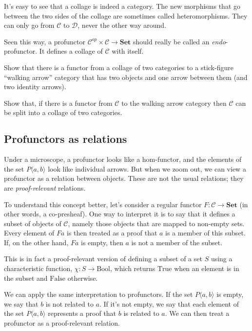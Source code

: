 \documentclass[DaoFP]{subfiles}
\begin{document}
It's easy to see that a collage is indeed a category. The new morphisms that go between the two sides of the collage are sometimes called heteromorphisms. They can only go from $\mathcal{C}$ to $\mathcal{D}$, never the other way around. 

Seen this way, a profunctor $ \mathcal{C}^{op} \times  \mathcal{C} \to \mathbf{Set}$ should really be called an \emph{endo}-profunctor. It defines a collage of $\mathcal{C}$ with itself.

\begin{exercise}
Show that there is a functor from a collage of two categories to a stick-figure ``walking arrow'' category that has two objects and one arrow between them (and two identity arrows).
\end{exercise}
\begin{exercise}
Show that, if there is a functor from $\mathcal{C}$ to the walking arrow category then $\mathcal{C}$ can be split into a collage of two categories. 
\end{exercise}

\subsection{Profunctors as relations}

Under a microscope, a profunctor looks like a hom-functor, and the elements of the set $P \langle a, b \rangle$ look like individual arrows. But when we zoom out, we can view a profunctor as a relation between objects. These are not the usual relations; they are \emph{proof-relevant} relations.

To understand this concept better, let's consider a regular functor $F \colon \mathcal{C} \to \mathbf{Set}$ (in other words, a co-presheaf). One way to interpret it is to say that it defines a  subset of objects of $\mathcal{C}$, namely those objects that are mapped to non-empty sets. Every element of $F a$ is then treated as a proof that $a$ is a member of this subset. If, on the other hand, $F a$ is empty, then $a$ is not a member of the subset. 

This is in fact a proof-relevant version of defining a subset of a set $S$ using a characteristic function, $\chi \colon S \to \text{Bool}$, which returns $\text{True}$ when an element is in the subset and $\text{False}$ otherwise.

We can apply the same interpretation to profunctors. If the set $P \langle a, b \rangle$ is empty, we say that $b$ is not related to $a$. If it's not empty, we say that each element of the set $P \langle a, b \rangle$ represents a proof that $b$ is related to $a$. We can then treat a profunctor as a proof-relevant relation. 
\end{document}
